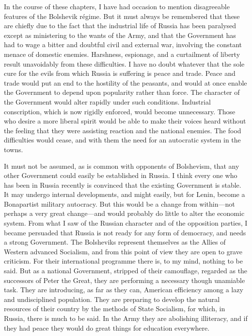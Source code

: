 In the course of these chapters, I have had occasion to mention disagreeable features of the Bolshevik régime. But it must always be remembered that these are chiefly due to the fact that the industrial life of Russia has been paralysed except as ministering to the wants of the Army, and that the Government has had to wage a bitter and doubtful civil and external war, involving the constant menace of domestic enemies. Harshness, espionage, and a curtailment of liberty result unavoidably from these difficulties. I have no doubt whatever that the sole cure for the evils from which Russia is suffering is peace and trade. Peace and trade would put an end to the hostility of the peasants, and would at once enable the Government to depend upon popularity rather than force. The character of the Government would alter rapidly under such conditions. Industrial conscription, which is now rigidly enforced, would become unnecessary. Those who desire a more liberal spirit would be able to make their voices heard without the feeling that they were assisting reaction and the national enemies. The food difficulties would cease, and with them the need for an autocratic system in the towns.

It must not be assumed, as is common with opponents of Bolshevism, that any other Government could easily be established in Russia. I think every one who has been in Russia recently is convinced that the existing Government is stable. It may undergo internal developments, and might easily, but for Lenin, become a Bonapartist military autocracy. But this would be a change from within---not perhaps a very great change---and would probably do little to alter the economic system. From what I saw of the Russian character and of the opposition parties, I became persuaded that Russia is not ready for any form of democracy, and needs a strong Government. The Bolsheviks represent themselves as the Allies of Western advanced Socialism, and from this point of view they are open to grave criticism. For their international programme there is, to my mind, nothing to be said. But as a national Government, stripped of their camouflage, regarded as the successors of Peter the Great, they are performing a necessary though unamiable task. They are introducing, as far as they can, American efficiency among a lazy and undisciplined population. They are preparing to develop the natural resources of their country by the methods of State Socialism, for which, in Russia, there is much to be said. In the Army they are abolishing illiteracy, and if they had peace they would do great things for education everywhere.


